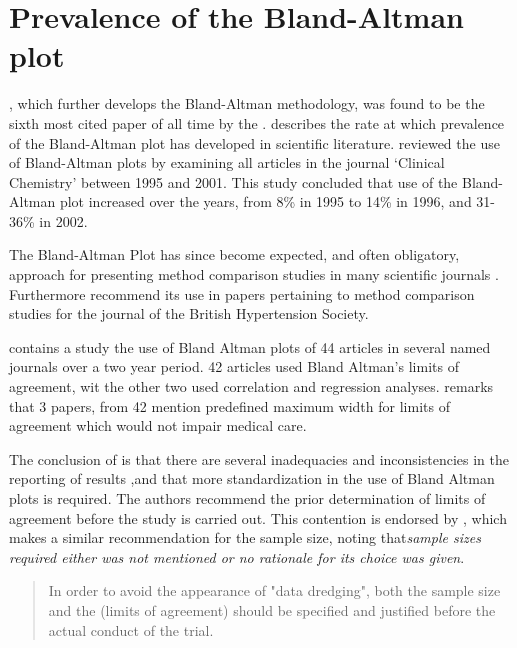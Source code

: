 \documentclass[12pt, a4paper]{report}
\theoremstyle{plain}
\theoremstyle{definition}
\theoremstyle{remark}
\begin{document}
	

\section{Prevalence of the Bland-Altman plot}

\citet*{BA86}, which further develops the Bland-Altman methodology,
was found to be the sixth most cited paper of all time by the
\citet{BAcite}. \cite{Dewitte} describes the rate at which
	prevalence of the Bland-Altman plot has developed in scientific
	literature. \citet{Dewitte} reviewed the use of Bland-Altman plots
	by examining all articles in the journal `Clinical Chemistry'
	between 1995 and 2001. This study concluded that use of the
	Bland-Altman plot increased over the years, from 8\% in 1995 to
	14\% in 1996, and 31-36\% in 2002.
	
	The Bland-Altman Plot has since become expected, and
	often obligatory, approach for presenting method comparison
	studies in many scientific journals \citep{hollis}. Furthermore
	\citet{BritHypSoc} recommend its use in papers pertaining to
	method comparison studies for the journal of the British
	Hypertension Society.
	

	\citet{mantha} contains a study the use of Bland Altman plots of
	44 articles in several named journals over a two year period. 42
	articles used Bland Altman's limits of agreement, wit the other
	two used correlation and regression analyses. \citet{mantha}
	remarks that 3 papers, from 42 mention predefined maximum width
	for limits of agreement which would not impair medical care.
	
	The conclusion of \citet{mantha} is that there are several
	inadequacies and inconsistencies in the reporting of results ,and
	that more standardization in the use of Bland Altman plots is
	required. The authors recommend the prior determination of limits
	of agreement before the study is carried out. This contention is
	endorsed by \citet{lin}, which makes a similar recommendation for
	the sample size, noting that\emph{sample sizes required either was
		not mentioned or no rationale for its choice was given}.
	
	\begin{quote}
		In order to avoid the appearance of "data dredging", both the
		sample size and the (limits of agreement) should be specified and
		justified before the actual conduct of the trial. \citep{lin}
	\end{quote}
	
\end{document}
